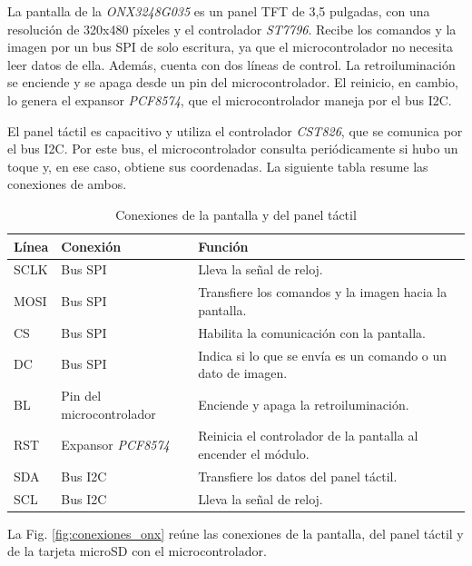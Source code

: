 La pantalla de la \emph{ONX3248G035} es un panel TFT de 3,5 pulgadas, con una resolución de 320x480 píxeles y el controlador \emph{ST7796}. Recibe los comandos y la imagen por un bus SPI de solo escritura, ya que el microcontrolador no necesita leer datos de ella. Además, cuenta con dos líneas de control. La retroiluminación se enciende y se apaga desde un pin del microcontrolador. El reinicio, en cambio, lo genera el expansor \emph{PCF8574}, que el microcontrolador maneja por el bus I2C.

El panel táctil es capacitivo y utiliza el controlador \emph{CST826}, que se comunica por el bus I2C. Por este bus, el microcontrolador consulta periódicamente si hubo un toque y, en ese caso, obtiene sus coordenadas. La siguiente tabla resume las conexiones de ambos.

\begin{table}[H]
    \centering
    \caption{Conexiones de la pantalla y del panel táctil}
    \label{tab:conexiones_pantalla}
    \begin{tabularx}{\textwidth}{|l|l|>{\raggedright\arraybackslash}X|}
        \hline
        \textbf{Línea} & \textbf{Conexión} & \textbf{Función} \\
        \hline
        SCLK & Bus SPI & Lleva la señal de reloj. \\
        \hline
        MOSI & Bus SPI & Transfiere los comandos y la imagen hacia la pantalla. \\
        \hline
        CS & Bus SPI & Habilita la comunicación con la pantalla. \\
        \hline
        DC & Bus SPI & Indica si lo que se envía es un comando o un dato de imagen. \\
        \hline
        BL & Pin del microcontrolador & Enciende y apaga la retroiluminación. \\
        \hline
        RST & Expansor \emph{PCF8574} & Reinicia el controlador de la pantalla al encender el módulo. \\
        \hline
        SDA & Bus I2C & Transfiere los datos del panel táctil. \\
        \hline
        SCL & Bus I2C & Lleva la señal de reloj. \\
        \hline
    \end{tabularx}
\end{table}

La Fig. \ref{fig:conexiones_onx} reúne las conexiones de la pantalla, del panel táctil y de la tarjeta microSD con el microcontrolador.

